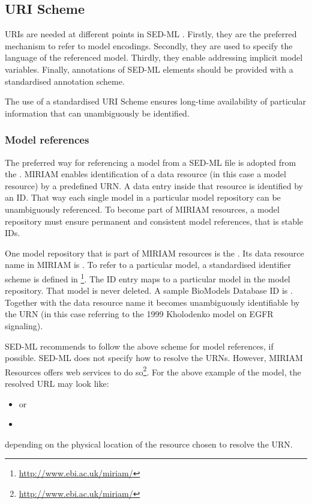   \subsection{URI Scheme}  
\label{sec:uriScheme}

URIs are needed at different points in SED-ML \LoneVtwo. 
Firstly, they are the preferred mechanism to refer to model encodings. 
Secondly, they are used to specify the language of the referenced model.
Thirdly, they enable addressing implicit model variables.
Finally, annotations of SED-ML elements should be provided with a standardised annotation scheme.

The use of a standardised URI Scheme ensures long-time availability  of particular information that can unambiguously be identified. 

\subsubsection{Model references}
\label{sec:modelURI}
The preferred way for referencing a model from a SED-ML file is adopted from the .
MIRIAM enables identification of a data resource (in this case a model resource) by a predefined URN. A data entry inside that resource is identified by an ID. 
That way each single  model  in a particular model repository can be unambiguously referenced. To become part of MIRIAM resources, a model repository must ensure permanent and consistent model references, that is stable IDs.

One model repository that is part of MIRIAM resources is the  \citep{LDR+10}. Its data resource name in MIRIAM is . To refer to a particular model, a standardised identifier scheme is defined in \footnote{\url{http://www.ebi.ac.uk/miriam/}}. The ID entry maps to a particular model in the model repository. That model is never deleted. 
A sample BioModels Database ID is . Together with the data resource name it becomes unambiguously identifiable by the URN  (in this case referring to the 1999 Kholodenko model on EGFR signaling). 
%

SED-ML recommends to follow the above scheme for model references, if possible. 
SED-ML does not specify how to resolve the URNs. However, MIRIAM Resources offers web services to do so\footnote{\url{http://www.ebi.ac.uk/miriam/}}. For the above example of the  model, the resolved URL may look like: 
\begin{itemize}
 \item{ or}
 \item{}
\end{itemize}
depending on the physical location of the resource chosen to resolve the URN.

